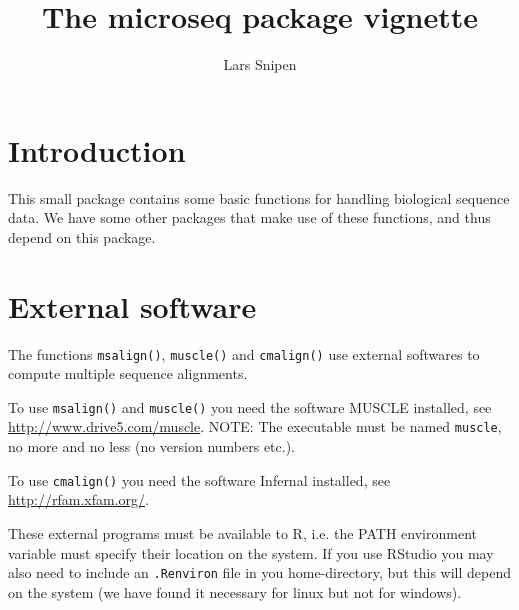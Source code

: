 \documentclass[a4paper]{article}
\title{The microseq package vignette}
\author{Lars Snipen}
\date{}
\begin{document}

\maketitle


\section{Introduction}
This small package contains some basic functions for handling biological sequence data. We have some other packages that make use of these functions, and thus depend on this package.


\section{External software}
The functions \texttt{msalign()}, \texttt{muscle()} and \texttt{cmalign()} use external softwares to compute multiple sequence alignments.

To use \texttt{msalign()} and \texttt{muscle()} you need the software MUSCLE installed, see \url{http://www.drive5.com/muscle}. NOTE: The executable must be named \texttt{muscle}, no more and no less (no version numbers etc.).

To use \texttt{cmalign()} you need the software Infernal installed, see \url{http://rfam.xfam.org/}.

These external programs must be available to R, i.e. the PATH environment variable must specify their location on the system. If you use RStudio you may also need to include an \texttt{.Renviron} file in you home-directory, but this will depend on the system (we have found it necessary for linux but not for windows).
\end{document}
